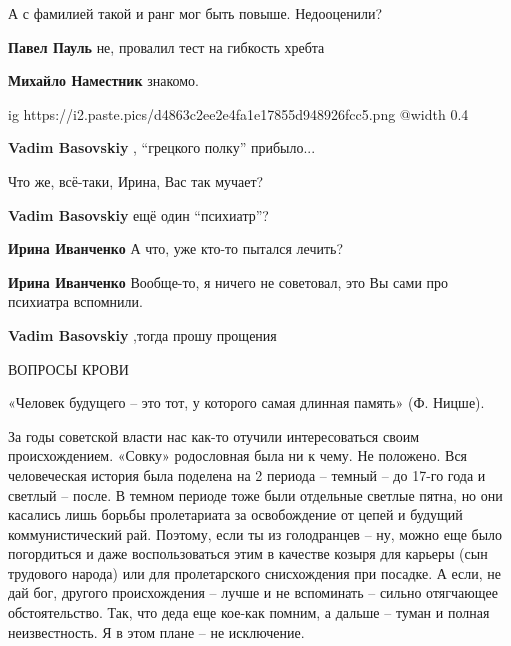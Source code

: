  
 
 
 
 
\zzSecCmt

\begin{itemize} %
А с фамилией такой и ранг мог быть повыше. Недооценили?

\begin{itemize} %
\textbf{Павел Пауль} не, провалил тест на гибкость хребта

\textbf{Михайло Наместник} знакомо.
\end{itemize} %



\ifcmt
  ig https://i2.paste.pics/d4863c2ee2e4fa1e17855d948926fcc5.png
  @width 0.4
\fi

\begin{itemize} %
\textbf{Vadim Basovskiy} , \enquote{грецкого полку} прибыло...


Что же, всё-таки, Ирина, Вас так мучает?

\textbf{Vadim Basovskiy} ещё один \enquote{психиатр}?

\textbf{Ирина Иванченко}
А что, уже кто-то пытался лечить?

\textbf{Ирина Иванченко}
Вообще-то, я ничего не советовал, это Вы сами про психиатра вспомнили.

\textbf{Vadim Basovskiy} ,тогда прошу прощения
\end{itemize} %


ВОПРОСЫ КРОВИ

«Человек будущего – это тот, у которого самая длинная память» (Ф. Ницше).

За годы советской власти нас как-то отучили интересоваться своим
происхождением. «Совку» родословная была ни к чему. Не положено. Вся
человеческая история была поделена на 2 периода – темный – до 17-го года и
светлый – после. В темном периоде тоже были отдельные светлые пятна, но они
касались лишь борьбы пролетариата за освобождение от цепей и будущий
коммунистический рай. Поэтому, если ты из голодранцев – ну, можно еще было
погордиться и даже воспользоваться этим в качестве козыря для карьеры (сын
трудового народа) или для пролетарского снисхождения при посадке. А если, не
дай бог, другого происхождения – лучше и не вспоминать – сильно отягчающее
обстоятельство. Так, что деда еще кое-как помним, а дальше – туман и полная
неизвестность. Я в этом плане – не исключение.


\end{itemize}
